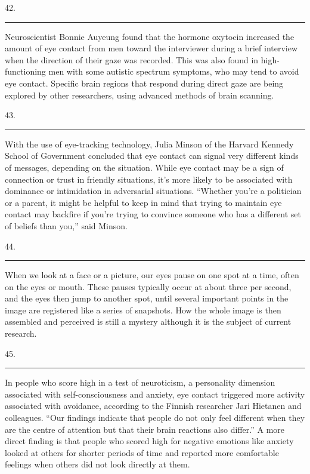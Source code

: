 \documentclass[UTF8,11pt]{ctexart}
\begin{document}
42. \par\noindent\rule{.95\linewidth}{.4pt}\par


Neuroscientist Bonnie Auyeung found that the hormone oxytocin increased the amount of eye contact from men toward the interviewer during a brief interview when the direction of their gaze was recorded. This was also found in high-functioning men with some autistic spectrum symptoms, who may tend to avoid eye contact. Specific brain regions that respond during direct gaze are being explored by other researchers, using advanced methods of brain scanning.


43. \par\noindent\rule{.95\linewidth}{.4pt}\par


With the use of eye-tracking technology, Julia Minson of the Harvard Kennedy School of Government concluded that eye contact can signal very different kinds of messages, depending on the situation. While eye contact may be a sign of connection or trust in friendly situations, it’s more likely to be associated with dominance or intimidation in adversarial situations. “Whether you’re a politician or a parent, it might be helpful to keep in mind that trying to maintain eye contact may backfire if you’re trying to convince someone who has a different set of beliefs than you,” said Minson.


44. \par\noindent\rule{.95\linewidth}{.4pt}\par


When we look at a face or a picture, our eyes pause on one spot at a time, often on the eyes or mouth. These pauses typically occur at about three per second, and the eyes then jump to another spot, until several important points in the image are registered like a series of snapshots. How the whole image is then assembled and perceived is still a mystery although it is the subject of current research.


45. \par\noindent\rule{.95\linewidth}{.4pt}\par


In people who score high in a test of neuroticism, a personality dimension associated with self-consciousness and anxiety, eye contact triggered more activity associated with avoidance, according to the Finnish researcher Jari Hietanen and colleagues. “Our findings indicate that people do not only feel different when they are the centre of attention but that their brain reactions also differ.” A more direct finding is that people who scored high for negative emotions like anxiety looked at others for shorter periods of time and reported more comfortable feelings when others did not look directly at them.
\end{document}
